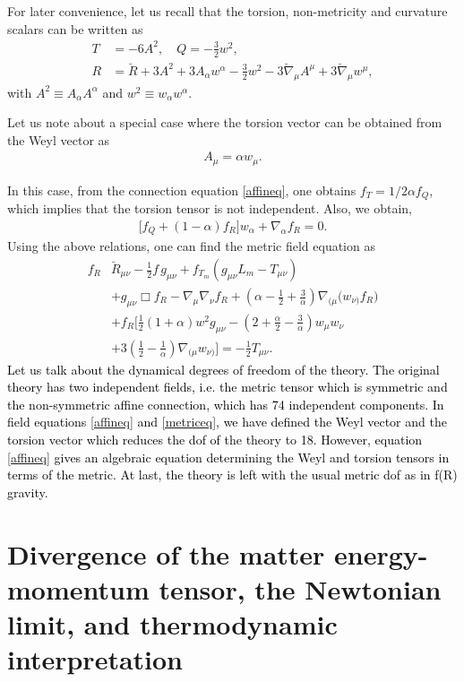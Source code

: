 \documentclass[aps,superscriptaddress, showpacs,preprintnumbers, superscriptaddress, nofootinbibt,twocolumn]{revtex4}
\newcommand{\f}[2]{\frac{#1}{#2}}
\newcommand{\te}[1]{\textcolor{black}{#1}}
\begin{document}
For later convenience, let us recall that the torsion, non-metricity and curvature scalars can be written as
\begin{align}
T&=-6A^2,\quad Q=-\frac32 w^2,\nonumber\\
R&=\breve{R}+3A^2+3A_\alpha w^\alpha-\frac32w^2-3\breve{\nabla}_\mu A^\mu+3\breve{\nabla}_\mu w^\mu,
\end{align}
with $A^2\equiv A_\alpha A^\alpha$ and $w^2\equiv w_\alpha w^\alpha$.

Let us note about a special case where the torsion vector can be obtained from the Weyl vector as
\begin{align}
A_\mu=\alpha w_\mu.
\end{align}

In this case, from the connection equation \eqref{affineq}, one obtains $f_T=1/2\alpha f_Q$, which implies that the torsion tensor is not independent. Also, we obtain,
\begin{align}
\Big[f_Q+(1-\alpha)f_R\Big]w_\alpha+\nabla_\alpha f_R=0.
\end{align}
Using the above relations, one can find the metric field equation as
\begin{align}
f_R &\breve{R}_{\mu\nu}-\frac12f\,g_{\mu\nu}+f_{T_m}(g_{\mu\nu}L_m-T_{\mu\nu})\nonumber\\&+g_{\mu\nu}\Box f_R-\nabla_\mu\nabla_\nu f_R+\left(\alpha-\f12+\f3\alpha\right)\nabla_{(\mu}\big(w_{\nu)}f_R\big)\nonumber\\&+f_R\Bigg[\f12(1+\alpha)w^2g_{\mu\nu}-\left(2+\f\alpha2-\f3\alpha\right)w_\mu w_\nu\nonumber\\&+3\left(\f12-\f1\alpha\right)\nabla_{(\mu}w_{\nu)}\Bigg]=-\frac12T_{\mu\nu}.
\end{align}
\te{Let us talk about the dynamical degrees of freedom of the theory. The original theory has two independent fields, i.e. the metric tensor which is symmetric and the non-symmetric affine connection, which has 74 independent components. In field equations \eqref{affineq} and \eqref{metriceq}, we have defined the Weyl vector and the torsion vector which reduces the dof of the theory to 18. However, equation \eqref{affineq} gives an algebraic equation determining the Weyl and torsion tensors in terms of the metric. At last, the theory is left with the usual metric dof as in f(R) gravity.}
\section{Divergence of the matter energy-momentum tensor, the Newtonian limit, and thermodynamic interpretation}\label{sect2}
\end{document}
